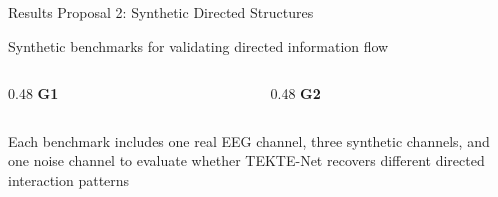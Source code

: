 \documentclass[aspectratio=169]{beamer}
\begin{document}

\begin{frame}{Results Proposal 2: Synthetic Directed Structures}

\centering
\large
Synthetic benchmarks for validating directed information flow

\vspace{0.25cm}

\begin{columns}[T,totalwidth=0.95\textwidth]

\begin{column}{0.48\textwidth}
\centering
\textbf{G1}

\vspace{0.15cm}

\resizebox{0.62\linewidth}{!}{
    
}
\end{column}

\begin{column}{0.48\textwidth}
\centering
\textbf{G2}

\vspace{0.15cm}

\resizebox{0.62\linewidth}{!}{
    
}
\end{column}

\end{columns}

\vfill

{\color{frameblue}\small
Each benchmark includes one real EEG channel, three synthetic channels, and one noise channel to evaluate whether TEKTE-Net recovers different directed interaction patterns
}

\end{frame}
\end{document}
